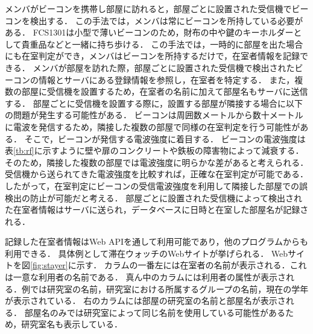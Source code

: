 

メンバがビーコンを携帯し部屋に訪れると，部屋ごとに設置された受信機でビーコンを検出する．
この手法では，メンバは常にビーコンを所持している必要がある．
FCS1301は小型で薄いビーコンのため，財布の中や鍵のキーホルダーとして貴重品などと一緒に持ち歩ける．
この手法では，一時的に部屋を出た場合にも在室判定ができ，メンバはビーコンを所持するだけで，在室者情報を記録できる．
メンバが部屋を訪れた際，部屋ごとに設置された受信機で検出されたビーコンの情報とサーバにある登録情報を参照し，在室者を特定する．
また，複数の部屋に受信機を設置するため，在室者の名前に加えて部屋名もサーバに送信する．
部屋ごとに受信機を設置する際に，設置する部屋が隣接する場合に以下の問題が発生する可能性がある．
ビーコンは周囲数メートルから数十メートルに電波を発信するため，隣接した複数の部屋で同様の在室判定を行う可能性がある．
そこで，ビーコンが発信する電波強度に着目する．
ビーコンの電波強度は表\ref{tb:rf}に示すように壁や扉のコンクリートや鉄板の障害物によって減衰する\cite{barrier}．
そのため，隣接した複数の部屋では電波強度に明らかな差があると考えられる．
受信機から送られてきた電波強度を比較すれば，正確な在室判定が可能である．
したがって，在室判定にビーコンの受信電波強度を利用して隣接した部屋での誤検出の防止が可能だと考える．
部屋ごとに設置された受信機によって検出された在室者情報はサーバに送られ，データベースに日時と在室した部屋名が記録される．

記録した在室者情報はWeb APIを通して利用可能であり，他のプログラムからも利用できる．
具体例として滞在ウォッチのWebサイトが挙げられる．
Webサイトを図\ref{fig:stayer}に示す．
カラムの一番左には在室者の名前が表示される．これは一意な利用者の名前である．
真ん中のカラムには利用者の属性が表示される．例では研究室の名前，研究室における所属するグループの名前，現在の学年が表示されている．
右のカラムには部屋の研究室の名前と部屋名が表示される．
部屋名のみでは研究室によって同じ名前を使用している可能性があるため，研究室名も表示している．

